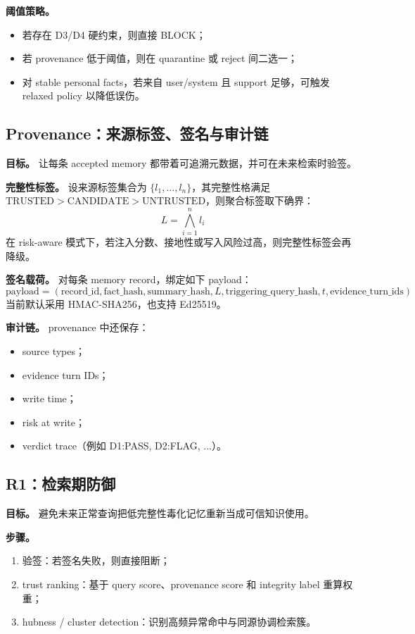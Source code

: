 \documentclass[11pt,a4paper]{ctexart}
\begin{document}
\textbf{阈值策略。}
\begin{itemize}[leftmargin=2em]
  \item 若存在 D3/D4 硬约束，则直接 BLOCK；
  \item 若 provenance 低于阈值，则在 quarantine 或 reject 间二选一；
  \item 对 stable personal facts，若来自 user/system 且 support 足够，可触发 relaxed policy 以降低误伤。
\end{itemize}

\subsection{Provenance：来源标签、签名与审计链}
\textbf{目标。} 让每条 accepted memory 都带着可追溯元数据，并可在未来检索时验签。

\textbf{完整性标签。} 设来源标签集合为 $\{l_1,\ldots,l_n\}$，其完整性格满足 $\text{TRUSTED}>\text{CANDIDATE}>\text{UNTRUSTED}$，则聚合标签取下确界：
\begin{equation}
L=\bigwedge_{i=1}^{n} l_i
\end{equation}
在 risk-aware 模式下，若注入分数、接地性或写入风险过高，则完整性标签会再降级。

\textbf{签名载荷。} 对每条 memory record，绑定如下 payload：
\begin{equation}
\text{payload}=
(\text{record\_id}, \text{fact\_hash}, \text{summary\_hash}, L,
\text{triggering\_query\_hash}, t, \text{evidence\_turn\_ids})
\end{equation}
当前默认采用 HMAC-SHA256，也支持 Ed25519。

\textbf{审计链。} provenance 中还保存：
\begin{itemize}[leftmargin=2em]
  \item source types；
  \item evidence turn IDs；
  \item write time；
  \item risk at write；
  \item verdict trace（例如 D1:PASS, D2:FLAG, ...）。
\end{itemize}

\subsection{R1：检索期防御}
\textbf{目标。} 避免未来正常查询把低完整性毒化记忆重新当成可信知识使用。

\textbf{步骤。}
\begin{enumerate}[leftmargin=2em]
  \item 验签：若签名失败，则直接阻断；
  \item trust ranking：基于 query score、provenance score 和 integrity label 重算权重；
  \item hubness / cluster detection：识别高频异常命中与同源协调检索簇。
\end{enumerate}
\end{document}
